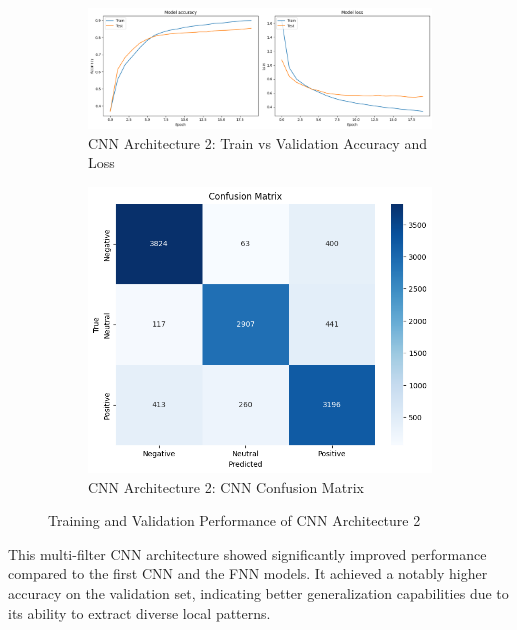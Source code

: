 \begin{figure}[h!]
\centering
\begin{subfigure}[t]{0.48\textwidth}
\centering
\includegraphics[width=\textwidth]{./images/cnn2-acc.png}
\caption{CNN Architecture 2: Train vs Validation Accuracy and Loss}
\label{fig:cnn2_accuracy}
\end{subfigure}
\hfill
\begin{subfigure}[t]{0.30\textwidth}
\centering
\includegraphics[width=\textwidth]{./images/cnn-cm.png}
\caption{CNN Architecture 2: CNN Confusion Matrix}
\label{fig:cnn2_loss}
\end{subfigure}
\caption{Training and Validation Performance of CNN Architecture 2}
\label{fig:cnn2_performance}
\end{figure}

This multi-filter CNN architecture showed significantly improved performance compared to the first CNN and the FNN models. It achieved a notably higher accuracy on the validation set, indicating better generalization capabilities due to its ability to extract diverse local patterns.

